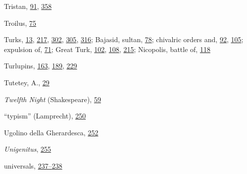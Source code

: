 Tristan,
\protect\hyperlink{10_Chapter_Three__THE_HEROIC_DREAM.xhtmlux5cux23page_91}{91},
\protect\hyperlink{21_Chapter_Thirteen__IMAGE_AND_WORD.xhtmlux5cux23page_358}{358}

Troilus,
\protect\hyperlink{10_Chapter_Three__THE_HEROIC_DREAM.xhtmlux5cux23page_75}{75}

Turks,
\protect\hyperlink{08_Chapter_One__THE_PASSIONATE_INTE.xhtmlux5cux23page_13}{13},
\protect\hyperlink{14_Chapter_Seven__THE_PIOUS_PERSONA.xhtmlux5cux23page_217}{217},
\protect\hyperlink{20_ILLUSTRATIONS_FOLLOW_PAGE.xhtmlux5cux23page_302}{302},
\protect\hyperlink{20_ILLUSTRATIONS_FOLLOW_PAGE.xhtmlux5cux23page_305}{305},
\protect\hyperlink{20_ILLUSTRATIONS_FOLLOW_PAGE.xhtmlux5cux23page_316}{316};
Bajasid, sultan,
\protect\hyperlink{10_Chapter_Three__THE_HEROIC_DREAM.xhtmlux5cux23page_78}{78};
chivalric orders and,
\protect\hyperlink{10_Chapter_Three__THE_HEROIC_DREAM.xhtmlux5cux23page_92}{92},
\protect\hyperlink{10_Chapter_Three__THE_HEROIC_DREAM.xhtmlux5cux23page_105}{105};
expulsion of,
\protect\hyperlink{10_Chapter_Three__THE_HEROIC_DREAM.xhtmlux5cux23page_71}{71};
Great Turk,
\protect\hyperlink{10_Chapter_Three__THE_HEROIC_DREAM.xhtmlux5cux23page_102}{102},
\protect\hyperlink{10_Chapter_Three__THE_HEROIC_DREAM.xhtmlux5cux23page_108}{108},
\protect\hyperlink{14_Chapter_Seven__THE_PIOUS_PERSONA.xhtmlux5cux23page_215}{215};
Nicopolis, battle of,
\protect\hyperlink{10_Chapter_Three__THE_HEROIC_DREAM.xhtmlux5cux23page_118}{118}

Turlupins,
\protect\hyperlink{12_Chapter_Five__THE_VISION_OF_DEAT.xhtmlux5cux23page_163}{163},
\protect\hyperlink{13_Chapter_Six__THE_DEPICTION_OF_TH.xhtmlux5cux23page_189}{189},
\protect\hyperlink{15_Chapter_Eight__RELIGIOUS_EXCITAT.xhtmlux5cux23page_229}{229}

Tutetey, A.,
\protect\hyperlink{08_Chapter_One__THE_PASSIONATE_INTE.xhtmlux5cux23page_29}{29}

\emph{Twelfth Night} (Shakespeare),
\protect\hyperlink{09_Chapter_Two__THE_CRAVING_FOR_A_M.xhtmlux5cux23page_59}{59}

``typism'' (Lamprecht),
\protect\hyperlink{17_Chapter_Ten__THE_FAILURE_OF_IMAG.xhtmlux5cux23page_250}{250}

Ugolino della Gherardesca,
\protect\hyperlink{17_Chapter_Ten__THE_FAILURE_OF_IMAG.xhtmlux5cux23page_252}{252}

\emph{Unigenitus},
\protect\hyperlink{17_Chapter_Ten__THE_FAILURE_OF_IMAG.xhtmlux5cux23page_255}{255}

universals,
\protect\hyperlink{16_Chapter_Nine__THE_DECLINE_OF_SYM.xhtmlux5cux23page_237}{237--}\protect\hyperlink{16_Chapter_Nine__THE_DECLINE_OF_SYM.xhtmlux5cux23page_238}{238}

